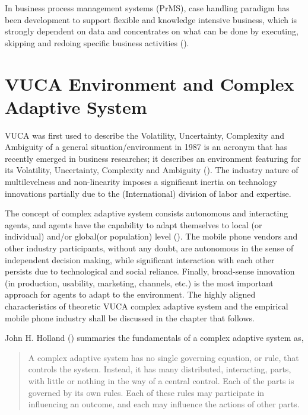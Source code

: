 \documentclass[utf8,english]{gradu3}
\begin{document}
In business process management systems (PrMS), case handling paradigm has been development to support flexible and knowledge intensive business, which is strongly dependent on data and concentrates on what can be done by executing, skipping and redoing specific business activities (\cite{van2005case}).

\section{VUCA Environment and Complex Adaptive System}

VUCA was first used to describe the Volatility, Uncertainty, Complexity and Ambiguity of a general situation/environment in 1987 is an acronym that has recently emerged in business researches; it describes an environment featuring for its Volatility, Uncertainty, Complexity and Ambiguity (\cite{bennett2014difference}). The industry nature of multilevelness and non-linearity imposes a significant inertia on technology innovations partially due to the (International) division of labor and expertise.

The concept of complex adaptive system consists autonomous and interacting agents, and agents have the capability to adapt themselves to local (or individual) and/or global(or population) level (\cite{macal2010tutorial}). The mobile phone vendors and other industry participants, without any doubt, are autonomous in the sense of independent decision making, while significant interaction with each other persists due to technological and social reliance. Finally, broad-sense innovation (in production, usability, marketing, channels, etc.) is the most important approach for agents to adapt to the environment. The highly aligned characteristics of theoretic VUCA complex adaptive system and the empirical mobile phone industry shall be discussed in the chapter that follows. 

John H. Holland (\citeyear{holland1992complex}) summaries the fundamentals of a complex adaptive system as,

\begin{quote}
A complex adaptive system has no single governing equation, or rule, that controls the system. Instead, it has many distributed, interacting, parts, with little or nothing in the way of a central control. Each of the parts is governed by its own rules. Each of these rules may participate in influencing an outcome, and each may influence the actions of other parts.
\end{quote}
\end{document}
